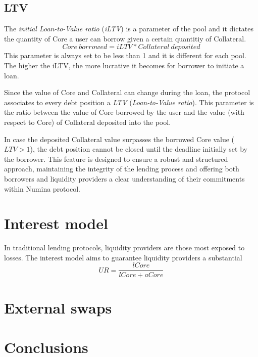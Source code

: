 \documentclass[12pt]{paper}
\begin{document}
	\subsection{LTV}
	\label{subsec:ltv}
		The \textit{initial Loan-to-Value ratio} (\textit{iLTV}) is a parameter of the pool and it dictates the quantity of Core a user can borrow given a certain quantitiy of Collateral.
		\begin{equation}
			Core\ borrowed = iLTV * Collateral\ deposited
		\end{equation}
		This parameter is always set to be less than 1 and it is different for each pool. The higher the iLTV, the more lucrative  it becomes for borrower to initiate a loan.
		\par Since the value of Core and Collateral can change during the loan, the protocol associates to every debt position a \textit{LTV} (\textit{Loan-to-Value ratio}). This parameter is the ratio between the value of Core borrowed by the user and the value (with respect to Core) of Collateral deposited into the pool.
		\par In case the deposited Collateral value surpasses the borrowed Core value ($LTV>1$), the debt position cannot be closed until the deadline initially set by the borrower. This feature is designed to ensure a robust and structured approach, maintaining the integrity of the lending process and offering both borrowers and liquidity providers a clear understanding of their commitments within Numina protocol.
		
\section{Interest model}
\label{sec:interest}
	In traditional lending protocols, liquidity providers are those most exposed to losses. The interest model aims to guarantee liquidity providers a substantial 
	\begin{equation}
		UR = \frac{lCore}{lCore + aCore}
	\end{equation}

\section{External swaps}

\section{Conclusions}
\label{sec:conclusions}
\end{document}
